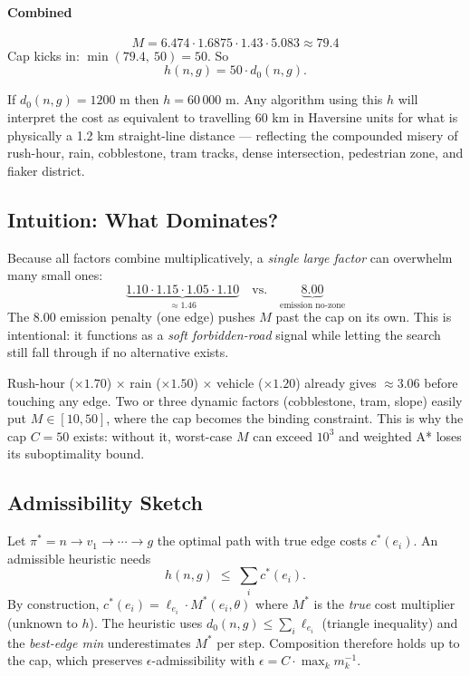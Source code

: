 \documentclass[12pt,a4paper]{article}
\begin{document}
\paragraph{Combined}
\[
M = 6.474\cdot 1.6875\cdot 1.43\cdot 5.083 \approx 79.4
\]
Cap kicks in: $\min(79.4,\ 50) = 50$. So
\[
h(n,g) = 50 \cdot d_0(n,g).
\]

If $d_0(n,g)=1200$ m then $h=60\,000$ m. Any algorithm using this $h$ will interpret the cost as equivalent to travelling 60 km in Haversine units for what is physically a 1.2 km straight-line distance — reflecting the compounded misery of rush-hour, rain, cobblestone, tram tracks, dense intersection, pedestrian zone, and fiaker district.

\subsection{Intuition: What Dominates?}

Because all factors combine multiplicatively, a \emph{single large factor} can overwhelm many small ones:
\[
\underbrace{1.10\cdot 1.15\cdot 1.05\cdot 1.10}_{\approx 1.46} \quad\text{vs.}\quad \underbrace{8.00}_{\text{emission no-zone}}
\]
The 8.00 emission penalty (one edge) pushes $M$ past the cap on its own. This is intentional: it functions as a \emph{soft forbidden-road} signal while letting the search still fall through if no alternative exists.

Rush-hour ($\times 1.70$) $\times$ rain ($\times 1.50$) $\times$ vehicle ($\times 1.20$) already gives $\approx 3.06$ before touching any edge. Two or three dynamic factors (cobblestone, tram, slope) easily put $M \in [10, 50]$, where the cap becomes the binding constraint. This is why the cap $C=50$ exists: without it, worst-case $M$ can exceed $10^3$ and weighted A* loses its suboptimality bound.

\subsection{Admissibility Sketch}

Let $\pi^*=n\!\to\!v_1\!\to\!\cdots\!\to\!g$ the optimal path with true edge costs $c^*(e_i)$. An admissible heuristic needs
\[
h(n,g) \;\le\; \sum_i c^*(e_i).
\]
By construction, $c^*(e_i) = \ell_{e_i}\cdot M^*(e_i,\theta)$ where $M^*$ is the \emph{true} cost multiplier (unknown to $h$). The heuristic uses $d_0(n,g) \le \sum_i \ell_{e_i}$ (triangle inequality) and the \emph{best-edge min} underestimates $M^*$ per step. Composition therefore holds up to the cap, which preserves $\epsilon$-admissibility with $\epsilon = C \cdot \max_k m_k^{-1}$.
\end{document}

